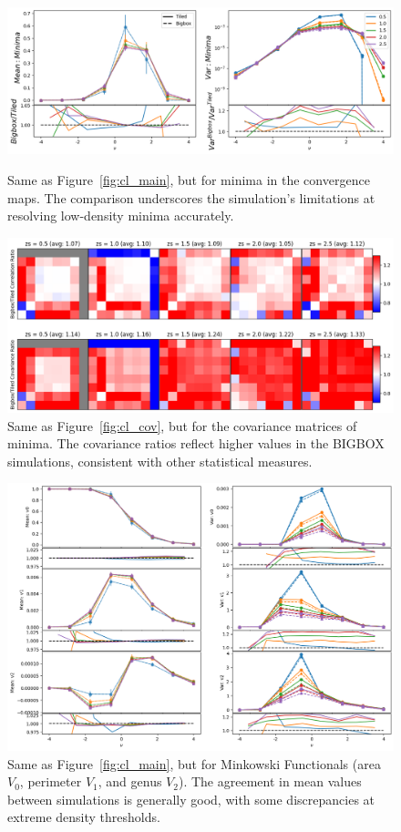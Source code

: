 \begin{figure}[p]
    \centering
    \includegraphics[width=\textwidth]{figures/results/minima_main.png}
    \caption[Minima Counts Mean and Variance]{Same as Figure~\ref{fig:cl_main}, but for minima in the convergence maps. The comparison underscores the simulation's limitations at resolving low-density minima accurately.}
    \label{fig:min_main}
    \vspace{2cm}
    \includegraphics[width=\textwidth]{figures/results/minima_cov.png}
    \caption[Minima Counts Covariance]{Same as Figure~\ref{fig:cl_cov}, but for the covariance matrices of minima. The covariance ratios reflect higher values in the BIGBOX simulations, consistent with other statistical measures.}
    \label{fig:min_cov}
\end{figure}

\begin{figure}[p]
    \centering
    \includegraphics[width=\textwidth]{figures/results/mfs_main.png}
    \caption[Minkowski Functionals Mean and Variance]{Same as Figure~\ref{fig:cl_main}, but for Minkowski Functionals (area $V_0$, perimeter $V_1$, and genus $V_2$). The agreement in mean values between simulations is generally good, with some discrepancies at extreme density thresholds.}
    \label{fig:mfs_main}
\end{figure}

